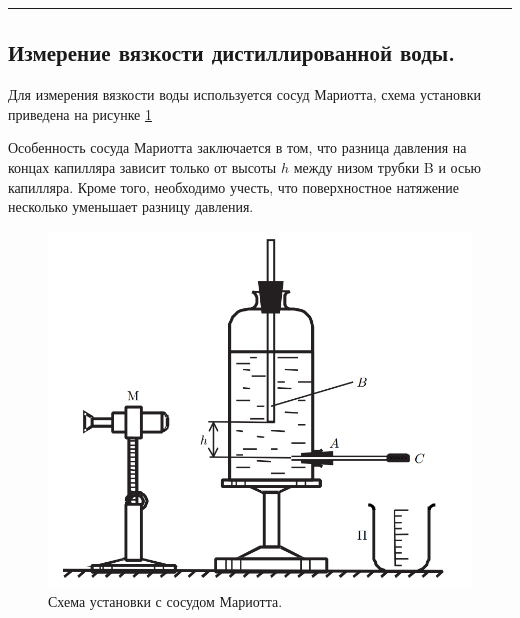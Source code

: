 \documentclass[a4paper,12pt]{report}
\begin{document}
    \hrule
    \begin{multicols}{2}
        \subsection*{Измерение вязкости дистиллированной воды.}
        Для измерения вязкости воды используется сосуд Мариотта, схема установки приведена на рисунке \ref{fig:ustanovka1}
        
        Особенность сосуда Мариотта заключается в том, что разница давления на концах капилляра зависит только от высоты $h$ между низом трубки B и осью капилляра. Кроме того, необходимо учесть, что поверхностное натяжение несколько уменьшает разницу давления.
        \begin{figure}[H]
            \centering
            \label{fig:ustanovka1}
            \includegraphics[width=0.75\columnwidth]{../img/ustanovka1.png}
            \caption{Схема установки с сосудом Мариотта.}
        \end{figure}
    \end{multicols}
    \newpage
\end{document}
